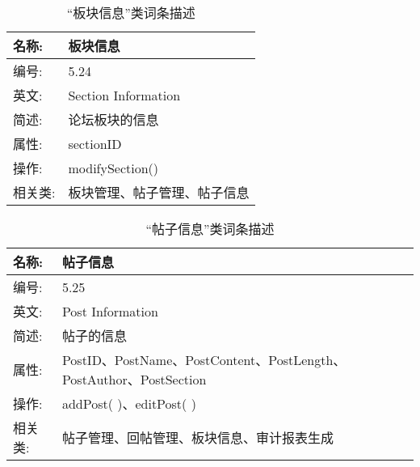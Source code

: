 \begin{table}[H]  
\caption{“板块信息”类词条描述}  
\begin{center}  
    \begin{tabular}{l p{11cm}} 
        \hline
        \quad 名称:  & 板块信息 \\
        \hline
        \quad 编号:  & 5.24 \\
        \hline
        \quad 英文:  &  Section Information\\
        \hline
        \quad 简述:  & 论坛板块的信息 \\
        \hline
        \quad 属性:  & sectionID\\
        \hline
        \quad 操作:  & modifySection()\\
        \hline
        \quad 相关类: & 板块管理、帖子管理、帖子信息\\
        \hline
    \end{tabular}
\end{center}
\end{table}

\begin{table}[H]  
\caption{“帖子信息”类词条描述}  
\begin{center}  
    \begin{tabular}{l p{11cm}} 
        \hline
        \quad 名称:  & 帖子信息 \\
        \hline
        \quad 编号:  & 5.25 \\
        \hline
        \quad 英文:  &  Post Information\\
        \hline
        \quad 简述:  & 帖子的信息 \\
        \hline
        \quad 属性:  & PostID、PostName、PostContent、PostLength、PostAuthor、PostSection \\
        \hline
        \quad 操作:  & addPost( )、editPost( )\\
        \hline
        \quad 相关类: & 帖子管理、回帖管理、板块信息、审计报表生成\\
        \hline
    \end{tabular}
\end{center}
\end{table}


